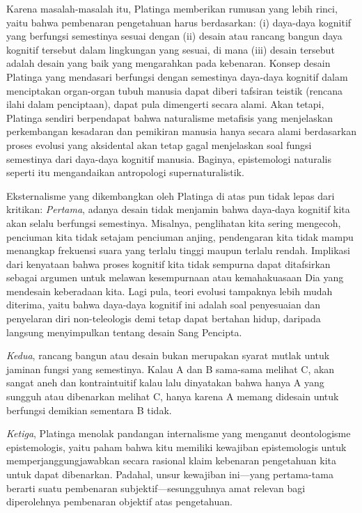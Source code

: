 \documentclass[11pt,twoside,a5paper,openany]{memoir}
\begin{document}
Karena masalah-masalah itu, Platinga memberikan rumusan yang lebih
rinci, yaitu bahwa pembenaran pengetahuan harus berdasarkan: (i)
daya-daya kognitif yang berfungsi semestinya sesuai dengan (ii) desain
atau rancang bangun daya kognitif tersebut dalam lingkungan yang sesuai,
di mana (iii) desain tersebut adalah desain yang baik yang mengarahkan
pada kebenaran. Konsep desain Platinga yang mendasari berfungsi dengan
semestinya daya-daya kognitif dalam menciptakan organ-organ tubuh
manusia dapat diberi tafsiran teistik (rencana ilahi dalam penciptaan),
dapat pula dimengerti secara alami. Akan tetapi, Platinga sendiri
berpendapat bahwa naturalisme metafisis yang menjelaskan perkembangan
kesadaran dan pemikiran manusia hanya secara alami berdasarkan proses
evolusi yang aksidental akan tetap gagal menjelaskan soal fungsi
semestinya dari daya-daya kognitif manusia. Baginya, epistemologi
naturalis seperti itu mengandaikan antropologi supernaturalistik.

Eksternalisme yang dikembangkan oleh Platinga di atas pun tidak lepas
dari kritikan: \emph{Pertama}, adanya desain tidak menjamin bahwa
daya-daya kognitif kita akan selalu berfungsi semestinya. Misalnya,
penglihatan kita sering mengecoh, penciuman kita tidak setajam penciuman
anjing, pendengaran kita tidak mampu menangkap frekuensi suara yang
terlalu tinggi maupun terlalu rendah. Implikasi dari kenyataan bahwa
proses kognitif kita tidak sempurna dapat ditafsirkan sebagai argumen
untuk melawan kesempurnaan atau kemahakuasaan Dia yang mendesain
keberadaan kita. Lagi pula, teori evolusi tampaknya lebih mudah
diterima, yaitu bahwa daya-daya kognitif ini adalah soal penyesuaian dan
penyelaran diri non-teleologis demi tetap dapat bertahan hidup, daripada
langsung menyimpulkan tentang desain Sang Pencipta.

\emph{Kedua}, rancang bangun atau desain bukan merupakan syarat mutlak
untuk jaminan fungsi yang semestinya. Kalau A dan B sama-sama melihat C,
akan sangat aneh dan kontraintuitif kalau lalu dinyatakan bahwa hanya A
yang sungguh atau dibenarkan melihat C, hanya karena A memang didesain
untuk berfungsi demikian sementara B tidak.

\emph{Ketiga}, Platinga menolak pandangan internalisme yang menganut
deontologisme epistemologis, yaitu paham bahwa kitu memiliki kewajiban
epistemologis untuk memperjanggungjawabkan secara rasional klaim
kebenaran pengetahuan kita untuk dapat dibenarkan. Padahal, unsur
kewajiban ini---yang pertama-tama berarti suatu pembenaran
subjektif---sesungguhnya amat relevan bagi diperolehnya pembenaran
objektif atas pengetahuan.
\end{document}
